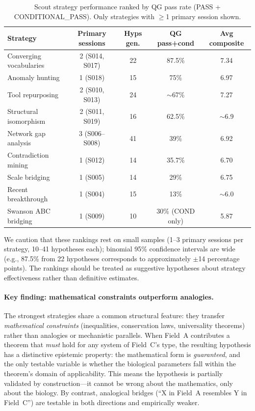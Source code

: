 \begin{table}[htbp]
\centering
\caption{Scout strategy performance ranked by QG pass rate (PASS + CONDITIONAL\_PASS). Only strategies with $\geq$1 primary session shown.}
\label{tab:strategies}
\small
\begin{tabular}{@{}lcccc@{}}
\toprule
\textbf{Strategy} & \textbf{Primary sessions} & \textbf{Hyps gen.} & \textbf{QG pass+cond} & \textbf{Avg composite} \\
\midrule
Converging vocabularies & 2 (S014, S017) & 22 & 87.5\% & 7.34 \\
Anomaly hunting & 1 (S018) & 15 & 75\% & 6.97 \\
Tool repurposing & 2 (S010, S013) & 24 & $\sim$67\% & 7.27 \\
Structural isomorphism & 2 (S011, S019) & 16 & 62.5\% & $\sim$6.9 \\
Network gap analysis & 3 (S006--S008) & 41 & 39\% & 6.92 \\
Contradiction mining & 1 (S012) & 14 & 35.7\% & 6.70 \\
Scale bridging & 1 (S005) & 14 & 29\% & 6.75 \\
Recent breakthrough & 1 (S004) & 15 & 13\% & $\sim$6.0 \\
Swanson ABC bridging & 1 (S009) & 10 & 30\% (COND only) & 5.87 \\
\bottomrule
\end{tabular}
\end{table}

We caution that these rankings rest on small samples (1--3 primary sessions per strategy, 10--41 hypotheses each); binomial 95\% confidence intervals are wide (e.g., 87.5\% from 22 hypotheses corresponds to approximately $\pm$14 percentage points). The rankings should be treated as suggestive hypotheses about strategy effectiveness rather than definitive estimates.

\paragraph{Key finding: mathematical constraints outperform analogies.} The strongest strategies share a common structural feature: they transfer \emph{mathematical constraints} (inequalities, conservation laws, universality theorems) rather than analogies or mechanistic parallels. When Field~A contributes a theorem that \emph{must} hold for any system of Field~C's type, the resulting hypothesis has a distinctive epistemic property: the mathematical form is \emph{guaranteed}, and the only testable variable is whether the biological parameters fall within the theorem's domain of applicability. This means the hypothesis is partially validated by construction---it cannot be wrong about the mathematics, only about the biology. By contrast, analogical bridges (``X in Field~A resembles Y in Field~C'') are testable in both directions and empirically weaker.

